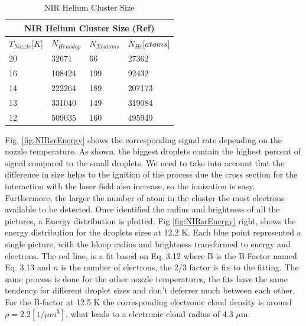 \begin{table}
\centering
\begin{tabular}{|l|l|l|l|}
\hline
\multicolumn{4}{|c|}{NIR  Helium Cluster Size (Ref)}                            \\ \hline
$T_{Nozzle} {[}K{]}$ &$ N_{He no dop}$ & $ N_{Xe atoms}$ & $N_{He}{[}atoms{]}$ \\ \hline
20                    & 32671          & 66        & 27362                      \\ \hline
16                    & 108424         & 199       & 92432                      \\ \hline
14                    & 222264         & 189       & 207173                     \\ \hline
13                    & 331040         & 149       & 319084                     \\ \hline
12                    & 509035         & 160       & 495949                     \\ \hline
\end{tabular}
\caption[NIR  Helium Cluster Size]{NIR  Helium Cluster Size}
\label{tab:NIRclustersize}
\end{table}


Fig. \ref{fig:NIRsrEnergy} shows the corresponding signal rate depending on the nozzle temperature. As shown, the biggest droplets contain the highest percent of signal compared to the small droplets. We need to take into account that the difference in size helps to the ignition of the process due the cross section for the interaction with the laser field also increase, so the ionization is easy. Furthermore, the larger the number of atom in the cluster the most electrons available to be detected. Once identified the radius and brightness of all the pictures, a Energy distribution is plotted. Fig \ref{fig:NIRsrEnergy} right, shows the energy distribution for the droplets sizes at 12.2 K. Each blue point represented a single picture, with the bloop radius and brightness transformed to energy and electrons. The red line, is a fit based on Eq. 3.12 where B is the B-Factor named Eq. 3.13 and $n$ is the number of electrons, the $2/3$ factor is fix to the fitting. The same process is done for the other nozzle temperatures, the fits have the same tendency for different droplet sizes and don't deferrer much between each other. For the B-factor at 12.5 K the corresponding electronic cloud density is around $\rho =2.2 [1/\mu m^{3}]$, what leads to a electronic cloud radius of  4.3 $\mu$m. 



